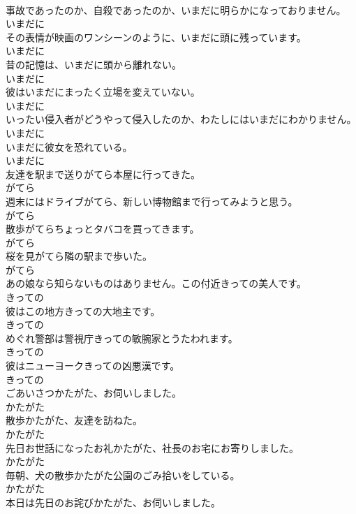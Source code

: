 \documentclass[8pt]{extreport}
\begin{document}
\begin{CJK}{UTF8}{min}
\\	事故であったのか、自殺であったのか、いまだに明らかになっておりません。	
\\	いまだに
\\	その表情が映画のワンシーンのように、いまだに頭に残っています。	
\\	いまだに
\\	昔の記憶は、いまだに頭から離れない。	
\\	いまだに
\\	彼はいまだにまったく立場を変えていない。	
\\	いまだに
\\	いったい侵入者がどうやって侵入したのか、わたしにはいまだにわかりません。	
\\	いまだに
\\	いまだに彼女を恐れている。	
\\	いまだに
\\	友達を駅まで送りがてら本屋に行ってきた。	
\\	がてら
\\	週末にはドライブがてら、新しい博物館まで行ってみようと思う。	
\\	がてら
\\	散歩がてらちょっとタバコを買ってきます。	
\\	がてら
\\	桜を見がてら隣の駅まで歩いた。	
\\	がてら
\\	あの娘なら知らないものはありません。この付近きっての美人です。	
\\	きっての
\\	彼はこの地方きっての大地主です。	
\\	きっての
\\	めぐれ警部は警視庁きっての敏腕家とうたわれます。	
\\	きっての
\\	彼はニューヨークきっての凶悪漢です。	
\\	きっての
\\	ごあいさつかたがた、お伺いしました。	
\\	かたがた
\\	散歩かたがた、友達を訪ねた。	
\\	かたがた
\\	先日お世話になったお礼かたがた、社長のお宅にお寄りしました。	
\\	かたがた
\\	毎朝、犬の散歩かたがた公園のごみ拾いをしている。	
\\	かたがた
\\	本日は先日のお詫びかたがた、お伺いしました。	

\end{CJK}
\end{document}
